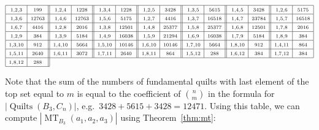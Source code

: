 \documentclass[12pt]{amsart}
\numberwithin{equation}{section}
\theoremstyle{definition}
\newcommand{\MT}{\operatorname{MT}}
\newcommand{\quilt}{\operatorname{Quilts}}
\begin{document}
 $$ \begin{array}{|c|c||c|c||c|c||c|c||c|c||c|c||c|c|} \hline
    \scriptstyle 1, 2, 3 & \scriptstyle 199 & \scriptstyle 1, 2, 4 & \scriptstyle 1228 & \scriptstyle 1, 3, 4 & \scriptstyle 1228 & \scriptstyle 1, 2, 5 & \scriptstyle 3428 & \scriptstyle  1, 3, 5 & \scriptstyle 5615 & \scriptstyle 1, 4, 5 & \scriptstyle 3428 & \scriptstyle 1, 2, 6 & \scriptstyle 5175 \\ \hline
    \scriptstyle 1, 3, 6 & \scriptstyle 12763 & \scriptstyle 1, 4, 6 & \scriptstyle 12763 & \scriptstyle 1, 5, 6 & \scriptstyle 5175 & \scriptstyle 1, 2, 7 & \scriptstyle 4416 & \scriptstyle 1, 3, 7 & \scriptstyle 16518 & \scriptstyle 1, 4, 7 & \scriptstyle 23784 & \scriptstyle 1, 5, 7 & \scriptstyle 16518 \\ \hline
    \scriptstyle 1, 6, 7 & \scriptstyle 4416 & \scriptstyle 1, 2, 8 & \scriptstyle 2016 & \scriptstyle 1, 3, 8 & \scriptstyle 12501 & \scriptstyle 1, 4, 8 & \scriptstyle 25377 & \scriptstyle 1, 5, 8 & \scriptstyle 25377 & \scriptstyle 1, 6, 8 & \scriptstyle 12501 & \scriptstyle 1, 7, 8 & \scriptstyle 2016 \\ \hline
    \scriptstyle 1, 2, 9 & \scriptstyle 384 & \scriptstyle 1, 3, 9 & \scriptstyle 5184 & \scriptstyle 1, 4, 9 & \scriptstyle 16038 & \scriptstyle 1, 5, 9 & \scriptstyle 21294 & \scriptstyle 1, 6, 9 & \scriptstyle 16038 & \scriptstyle 1, 7, 9 & \scriptstyle 5184 & \scriptstyle 1, 8, 9 & \scriptstyle 384 \\ \hline
    \scriptstyle 1, 3, 10 & \scriptstyle 912 & \scriptstyle 1, 4, 10 & \scriptstyle 5664 & \scriptstyle 1, 5, 10 & \scriptstyle 10146 & \scriptstyle 1, 6, 10 & \scriptstyle 10146 & \scriptstyle 1, 7, 10 & \scriptstyle 5664 & \scriptstyle 1, 8, 10 & \scriptstyle 912 & \scriptstyle 1, 4, 11 & \scriptstyle 864 \\ \hline
    \scriptstyle 1, 5, 11 & \scriptstyle 2640 & \scriptstyle  1, 6, 11 & \scriptstyle 3072 & \scriptstyle 1, 7, 11 & \scriptstyle 2640 & \scriptstyle 1, 8, 11 & \scriptstyle 864 & \scriptstyle 1, 5, 12 & \scriptstyle 288 & \scriptstyle 1, 6, 12 & \scriptstyle 384 & \scriptstyle 1, 7, 12 & \scriptstyle 384 \\ \hline
    \scriptstyle 1, 8, 12 & \scriptstyle 288 \\ \cline{1-2}
 \end{array}$$

 Note that the sum of the numbers of fundamental quilts with last element of the top set equal to $m$ is equal to the coefficient of $\binom n m$ in the formula for $|\quilt(B_3,C_n)|$, e.g.\ $3428+5615+3428 = 12471$. Using this table, we can compute $|\MT_{B_3}(a_1,a_2,a_3)|$ using Theorem~\ref{thm:mt}:
\end{document}
